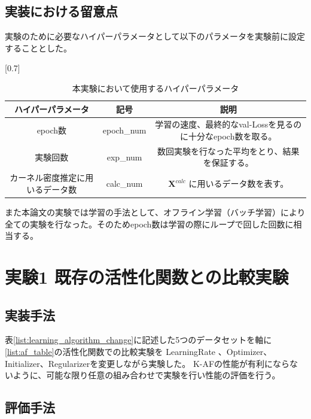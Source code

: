 \subsection{実装における留意点}
実験のために必要なハイパーパラメータとして以下のパラメータを実験前に設定することとした。

\begin{table}[htbp]
    \begin{center}
        \caption{本実験において使用するハイパーパラメータ}
        \vspace{2mm} 
        \scalebox{0.7}[0.7]{
            \begin{tabular}{||c | c |c||}
            ハイパーパラメータ & 記号 & 説明 \\
            \hline
            epoch数                           & epoch\_num      & 学習の速度、最終的なval-Lossを見るのに十分なepoch数を取る。  \\
            実験回数                           & exp\_num     & 数回実験を行なった平均をとり、結果を保証する。 \\
            カーネル密度推定に用いるデータ数        & calc\_num           & $ \mathbf{X}^{calc} $ に用いるデータ数を表す。  \\
            \end{tabular}
        }
    \end{center}
\end{table}

また本論文の実験では学習の手法として、オフライン学習（バッチ学習）により全ての実験を行なった。そのためepoch数は学習の際にループで回した回数に相当する。



\section{実験1 既存の活性化関数との比較実験}
\label{exp1}
\subsection{実装手法}

表\ref{list:learning_algorithm_change}に記述した5つのデータセットを軸に\ref{list:af_table}の活性化関数での比較実験を
LearningRate 、Optimizer、Initializer、Regularizerを変更しながら実験した。
K-AFの性能が有利にならないように、可能な限り任意の組み合わせで実験を行い性能の評価を行う。



\subsection{評価手法}

